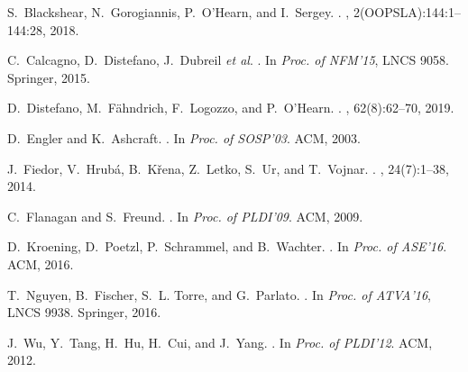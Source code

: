 \documentclass[runningheads]{llncs}
\begin{document}
\begin{thebibliography}{1}
\vspace*{-2mm}

S.~Blackshear, N.~Gorogiannis, P.~O'Hearn, and I.~Sergey.
.
,
  2(OOPSLA):144:1--144:28, 2018.

C.~Calcagno, D.~Distefano, J.~Dubreil \emph{et al}. 
.
\newblock In {\em Proc. of NFM'15}, LNCS 9058. Springer, 2015.

D.~Distefano, M.~F\"{a}hndrich, F.~Logozzo, and P.~O'Hearn.
.
, 62(8):62--70, 2019.

D.~Engler and K.~Ashcraft.
.
\newblock In {\em Proc. of SOSP'03}. ACM, 2003.

J.~Fiedor, V.~Hrub\'{a}, B.~K\v{r}ena, Z.~Letko, S.~Ur, and T.~Vojnar.
.
, 24(7):1--38,
  2014.

C.~Flanagan and S.~Freund.
.
\newblock In {\em Proc. of PLDI'09}. ACM, 2009.

D.~Kroening, D.~Poetzl, P.~Schrammel, and B.~Wachter.
.
\newblock In {\em Proc. of ASE'16}. ACM, 2016.

T.~Nguyen, B.~Fischer, S.~L. Torre, and G.~Parlato.
.
\newblock In {\em Proc. of ATVA'16}, LNCS 9938. Springer, 2016.

J.~Wu, Y.~Tang, H.~Hu, H.~Cui, and J.~Yang.
.
\newblock In {\em Proc. of PLDI'12}. ACM, 2012.

\end{thebibliography}


\end{document}
